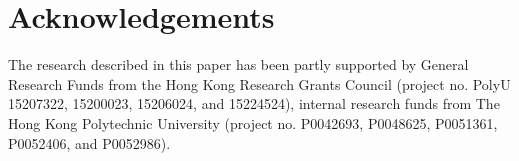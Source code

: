 \section{Acknowledgements}
The research described in this paper has been partly supported by General Research Funds from the Hong Kong Research Grants Council (project no. PolyU 15207322, 15200023, 15206024, and 15224524), internal research funds from The Hong Kong Polytechnic University (project no. P0042693, P0048625, P0051361, P0052406, and P0052986). 

